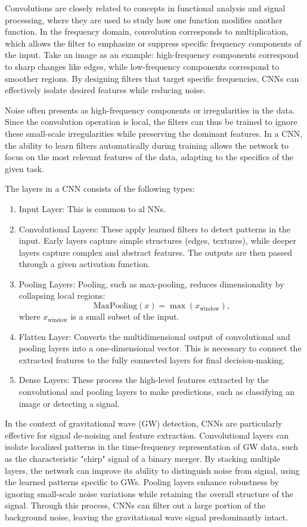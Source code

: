\documentclass[%
reprint,
amsmath,amssymb,
aps,
]{revtex4-2}
\begin{document}
Convolutions are closely related to concepts in functional analysis and signal processing, where they are used to study how one function modifies another function. In the frequency domain, convolution corresponds to multiplication, which allows the filter to emphasize or suppress specific frequency components of the input. Take an image as an example: high-frequency components correspond to sharp changes like edges, while low-frequency components correspond to smoother regions. By designing filters that target specific frequencies, CNNs can effectively isolate desired features while reducing noise.

Noise often presents as high-frequency components or irregularities in the data. Since the convolution operation is local, the filters can thus be trained to ignore these small-scale irregularities while preserving the dominant features. In a CNN, the ability to learn filters automatically during training allows the network to focus on the most relevant features of the data, adapting to the specifics of the given task.

The layers in a CNN consists of the following types:
\begin{enumerate}
	\item Input Layer: This is common to al NNs.
	\item Convolutional Layers: These apply learned filters to detect patterns in the input. Early layers capture simple structures (edges, textures), while deeper layers capture complex and abstract features. The outputs are then passed through a given activation function.
	\item Pooling Layers: Pooling, such as max-pooling, reduces dimensionality by collapsing local regions:
	\[\text{MaxPooling}(x)=\max(x_{\text{window}}),\]
	where \( x_{\text{window}} \) is a small subset of the input.
	\item Flatten Layer: Converts the multidimensional output of convolutional and pooling layers into a one-dimensional vector. This is necessary to connect the extracted features to the fully connected layers for final decision-making.
	\item Dense Layers: These process the high-level features extracted by the convolutional and pooling layers to make predictions, such as classifying an image or detecting a signal.
\end{enumerate}

In the context of gravitational wave (GW) detection, CNNs are particularly effective for signal de-noising and feature extraction. Convolutional layers can isolate localized patterns in the time-frequency representation of GW data, such as the characteristic "chirp" signal of a binary merger. By stacking multiple layers, the network can improve its ability to distinguish noise from signal, using the learned patterns specific to GWs. Pooling layers enhance robustness by ignoring small-scale noise variations while retaining the overall structure of the signal. Through this process, CNNs can filter out a large portion of the background noise, leaving the gravitational wave signal predominantly intact.
\end{document}
